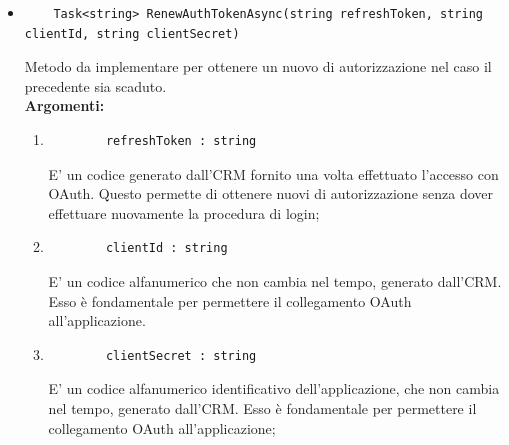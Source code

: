 \begin{itemize}
	\item 
	\begin{lstlisting}
	Task<string> RenewAuthTokenAsync(string refreshToken, string clientId, string clientSecret)
	\end{lstlisting}
	Metodo da implementare per ottenere un nuovo  di autorizzazione nel caso il precedente sia scaduto.\\
	\textbf{\small Argomenti:}
	\begin{enumerate}[leftmargin=*]
		\itemsep0em
		\item 
		\begin{lstlisting}
		refreshToken : string
		\end{lstlisting}
		E' un codice generato dall'CRM fornito una volta effettuato l'accesso con OAuth. Questo permette di ottenere nuovi  di autorizzazione senza dover effettuare nuovamente la procedura di login;
		\item 
		\begin{lstlisting}
		clientId : string
		\end{lstlisting}
		E' un codice alfanumerico che non cambia nel tempo, generato dall'CRM. Esso è fondamentale per permettere il collegamento OAuth all'applicazione. 
		\item 
		\begin{lstlisting}
		clientSecret : string
		\end{lstlisting}
		E' un codice alfanumerico identificativo dell'applicazione, che non cambia nel tempo, generato dall'CRM. Esso è fondamentale per permettere il collegamento OAuth all'applicazione; 
	\end{enumerate}


\end{itemize}
